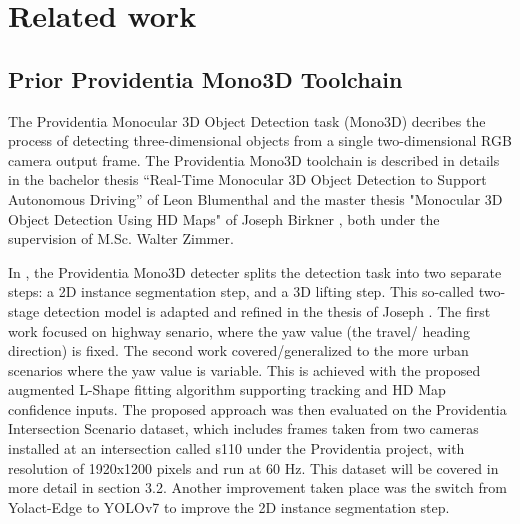 \chapter{Related work}%

\section{Prior Providentia Mono3D Toolchain}

The Providentia Monocular 3D Object Detection task (Mono3D) decribes the process of detecting three-dimensional objects from a single two-dimensional RGB camera output frame. The Providentia Mono3D toolchain is described in details in the bachelor thesis “Real-Time Monocular 3D Object Detection to Support Autonomous Driving” of Leon Blumenthal \cite{thesisLeon} and the master thesis "Monocular 3D Object Detection Using HD Maps" of Joseph Birkner \cite{thesisJoseph}, both under the supervision of  M.Sc. Walter Zimmer. 

In \cite{thesisLeon}, the Providentia Mono3D detecter splits the detection task into two separate steps: a 2D instance segmentation step, and a 3D lifting step. This so-called two-stage detection model is adapted and refined in the thesis of Joseph  \cite{thesisJoseph}. The first work focused on highway senario, where the yaw value (the travel/ heading direction) is fixed. The second work covered/generalized to the more urban scenarios where the yaw value is variable. This is achieved with the proposed augmented L-Shape fitting algorithm supporting tracking and HD Map confidence inputs. The proposed approach was then evaluated on the Providentia Intersection Scenario dataset, which includes frames taken from two cameras installed at an intersection called s110 under the Providentia project, with resolution of 1920x1200 pixels and run at 60 Hz. This dataset will be covered in more detail in section 3.2. Another improvement taken place was the switch from Yolact-Edge to YOLOv7 to improve the 2D instance segmentation step. 

